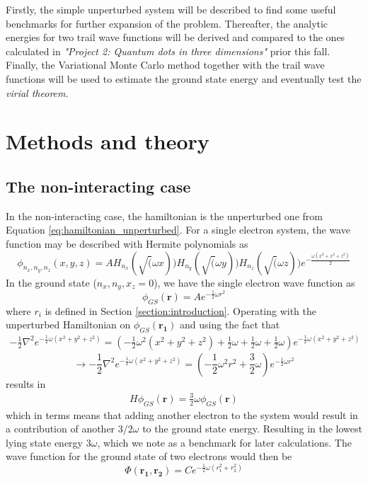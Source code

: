 \documentclass[12pt,english,a4paper]{article}
\begin{document}
Firstly, the simple unperturbed system will be described to find some useful benchmarks for further expansion of the problem. Thereafter, the analytic energies for two trail wave functions will be derived and compared to the ones calculated in \textit{"Project 2: Quantum dots in three dimensions"} \cite{GitHub} prior this fall. Finally, the Variational Monte Carlo method together with the trail wave functions will be used to estimate the ground state energy and eventually test the \textit{virial theorem}. 

\newpage

\section{Methods and theory} \label{section:theory}
\subsection{The non-interacting case} \label{section:theory:non-interacting}

In the non-interacting case, the hamiltonian is the unperturbed one from Equation \eqref{eq:hamiltonian_unperturbed}. For a single electron system, the wave function may be described with Hermite polynomials as
\begin{equation}
    \phi_{n_x,n_y,n_z}(x,y,z)=AH_{n_x}(\sqrt(\omega x))H_{n_y}(\sqrt(\omega y))H_{n_z}(\sqrt(\omega z))e^{-\frac{\omega (x^2+x^2+z^2)}{2}}
\end{equation}
In the ground state ($n_x,n_y,x_z=0$), we have the single electron wave function as
\begin{equation}
    \phi_{GS}(\boldsymbol{r})=Ae^{-\frac{1}{2}\omega r^2}
\end{equation}
where $r_i$ is defined in Section \ref{section:introduction}. Operating with the unperturbed Hamiltonian on $\phi_{GS}(\boldsymbol{r_1})$ and using the fact that
\begin{align*}
    -\frac{1}{2}\nabla^2 e^{-\frac{1}{2}\omega (x^2+y^2+z^2)}=\left(-\frac{1}{2}\omega^2\left(x^2+y^2+z^2\right)+\frac{1}{2}\omega+\frac{1}{2}\omega+\frac{1}{2}\omega\right)e^{-\frac{1}{2}\omega (x^2+y^2+z^2)}
\end{align*}
\begin{equation}
    \rightarrow -\frac{1}{2}\nabla^2 e^{-\frac{1}{2}\omega (x^2+y^2+z^2)}=\left(-\frac{1}{2}\omega^2r^2+\frac{3}{2}\omega\right)e^{-\frac{1}{2}\omega r^2}
    \label{eq:partial_derivative}
\end{equation}
results in
\begin{align*}
    H\phi_{GS}(\boldsymbol{r})=\frac{3}{2}\omega\phi_{GS}(\boldsymbol{r})
\end{align*}
which in terms means that adding another electron to the system would result in a contribution of another $3/2\omega$ to the ground state energy. Resulting in the lowest lying state energy $3\omega$, which we note as a benchmark for later calculations. The wave function for the ground state of two electrons would then be
\begin{equation}
    \Phi(\boldsymbol{r_1},\boldsymbol{r_2})=Ce^{-\frac{1}{2}\omega(r_1^2+r_2^2)}
    \label{eq:groundstate_two_electrons}
\end{equation}
\end{document}
